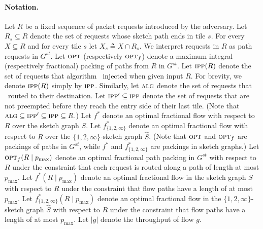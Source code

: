 \documentclass[11pt]{article}
\newcommand{\route}{\text{\sc{ipp}}}
\newcommand{\IPP}{\route}
\newcommand{\opt}{\text{\textsc{opt}}}
\newcommand{\pmax}{p_{\max}}
\newcommand{\eqdf}{\triangleq}
\newcommand{\alg}{\text{\sc{alg}}}
\newenvironment{proof sketch}[1]{\noindent {\emph{Proof sketch of #1:}}}{\hfill \qed}
\begin{document}
\paragraph{Notation.}
Let $R$ be a fixed sequence of packet requests introduced by the adversary.
Let $R_s \subseteq R$ denote the set of requests whose sketch path ends in tile $s$.
For every $X \subseteq R$ and for every tile $s$ let $X_s \eqdf X \cap R_s$.
We interpret requests in $R$ as path requests in $G^{st}$.  Let $\opt$ (respectively
$\opt_f$) denote a maximum integral (respectively fractional) packing of paths from
$R$ in $G^{st}$.
Let $\IPP(R)$ denote the set of requests that algorithm \IPP\ injected when
given input $R$.  For brevity, we denote $\IPP(R)$ simply by $\IPP$.
Similarly, let $\alg$ denote the set of requests that \alg\ routed to their
destination.  Let $\IPP'\subseteq \IPP$ denote the set of requests that are not
preempted before they reach the entry side of their last tile.
(Note that $\alg \subseteq \IPP' \subseteq \IPP \subseteq R$.)
Let $f^*$ denote an optimal fractional flow with respect to $R$ over the sketch graph $S$.
Let $f^*_{\{1,2,\infty\}}$ denote an optimal fractional flow with respect to $R$
over the $\{1,2,\infty\}$-sketch graph $\hat S$.
(Note that $\opt$ and $\opt_f$ are packings of paths in $G^{st}$, while $f^*$ and
$f^*_{\{1,2,\infty\}}$ are packings in sketch graphs.)
Let $\opt_f(R \mid \pmax)$ denote an  optimal fractional path packing in $G^{st}$ with respect to $R$ under the constraint that each request is routed along a path of length at most $\pmax$.
Let $f^*(R \mid \pmax)$ denote an
optimal fractional flow in the sketch graph $S$ with respect to
$R$ under the constraint that flow paths have a length of at most $\pmax$.
Let $f^*_{\{1,2,\infty\}}(R \mid \pmax)$ denote an
optimal fractional flow in the $\{1,2,\infty\}$-sketch graph $\hat S$ with respect to
$R$ under the constraint that flow paths have a length of at most $\pmax$.
Let $|g|$ denote the throughput of flow $g$.
\end{document}

